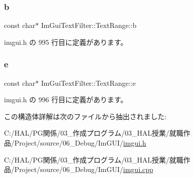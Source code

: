 \subsubsection{\texorpdfstring{b}{b}}
{\footnotesize\ttfamily const char$\ast$ Im\+Gui\+Text\+Filter\+::\+Text\+Range\+::b}



 imgui.\+h の 995 行目に定義があります。

\mbox{\label{struct_im_gui_text_filter_1_1_text_range_a20daef0e47167d49a017d8f54cb7c607}} 
\subsubsection{\texorpdfstring{e}{e}}
{\footnotesize\ttfamily const char$\ast$ Im\+Gui\+Text\+Filter\+::\+Text\+Range\+::e}



 imgui.\+h の 996 行目に定義があります。



この構造体詳解は次のファイルから抽出されました\+:\begin{DoxyCompactItemize}
\item 
C\+:/\+H\+A\+L/\+P\+G関係/03\+\_\+作成プログラム/03\+\_\+\+H\+A\+L授業/就職作品/\+Project/source/06\+\_\+\+Debug/\+Im\+G\+U\+I/\mbox{\hyperlink{imgui_8h}{imgui.\+h}}\item 
C\+:/\+H\+A\+L/\+P\+G関係/03\+\_\+作成プログラム/03\+\_\+\+H\+A\+L授業/就職作品/\+Project/source/06\+\_\+\+Debug/\+Im\+G\+U\+I/\mbox{\hyperlink{imgui_8cpp}{imgui.\+cpp}}\end{DoxyCompactItemize}
